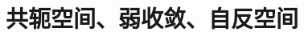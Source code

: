 \begin{enumerate}[leftmargin=2cm, label=\arabic*]
			
			
		
		
	\end{enumerate}
	
	
	
	
	\section{共轭空间、弱收敛、自反空间}
